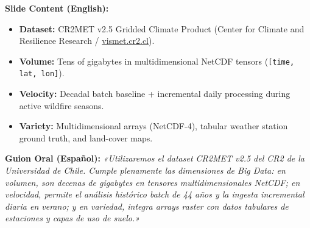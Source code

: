 \documentclass[11pt,a4paper]{article}
\begin{document}
\begin{tcolorbox}[colback=white, colframe=primaryblue, title=\textbf{Slide 4: Dataset \& Big Data Dimensions (2:45 -- 3:45)}]
\textbf{Slide Content (English):}
\begin{itemize}[leftmargin=4mm, itemsep=1pt]
    \item \textbf{Dataset:} CR2MET v2.5 Gridded Climate Product (Center for Climate and Resilience Research / \url{vismet.cr2.cl}).
    \item \textbf{Volume:} Tens of gigabytes in multidimensional NetCDF tensors (\texttt{[time, lat, lon]}).
    \item \textbf{Velocity:} Decadal batch baseline + incremental daily processing during active wildfire seasons.
    \item \textbf{Variety:} Multidimensional arrays (NetCDF-4), tabular weather station ground truth, and land-cover maps.
\end{itemize}
\textbf{Guion Oral (Español):}
\textit{«Utilizaremos el dataset CR2MET v2.5 del CR2 de la Universidad de Chile. Cumple plenamente las dimensiones de Big Data: en volumen, son decenas de gigabytes en tensores multidimensionales NetCDF; en velocidad, permite el análisis histórico batch de 44 años y la ingesta incremental diaria en verano; y en variedad, integra arrays raster con datos tabulares de estaciones y capas de uso de suelo.»}
\end{tcolorbox}
\end{document}
